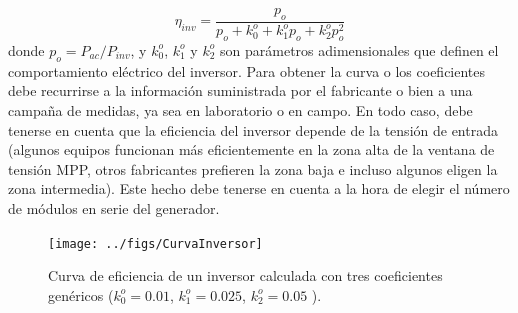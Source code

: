 \begin{equation}
\eta_{inv}=\frac{p_{o}}{p_{o}+k_{0}^{o}+k_{1}^{o}p_{o}+k_{2}^{o}p_{o}^{2}}\end{equation}
donde $p_{o}=P_{ac}/P_{inv}$,
y $k_{0}^{o}$, $k_{1}^{o}$ y $k_{2}^{o}$
son parámetros adimensionales que definen el comportamiento eléctrico
del inversor. Para obtener la curva o los coeficientes debe recurrirse
a la información suministrada por el fabricante o bien a una campaña
de medidas, ya sea en laboratorio o en campo. En todo caso, debe tenerse
en cuenta que la eficiencia del inversor depende de la tensión de
entrada \cite{Baumgartner.Schmidt.ea2007}(algunos equipos funcionan más eficientemente en la zona alta
de la ventana de tensión MPP, otros fabricantes prefieren la zona
baja e incluso algunos eligen la zona intermedia). Este hecho debe
tenerse en cuenta a la hora de elegir el número de módulos en serie
del generador.

%
\begin{figure}
\begin{centering}
\texttt{[image: ../figs/CurvaInversor]}
\end{centering}

\caption[Curva de eficiencia de un inversor.]{Curva de eficiencia de un inversor calculada con tres coeficientes
genéricos ($k_{0}^{o}=0.01$, $k_{1}^{o}=0.025$, $k_{2}^{o}=0.05$
). \label{fig:Curva-de-eficiencia}}

\end{figure}


